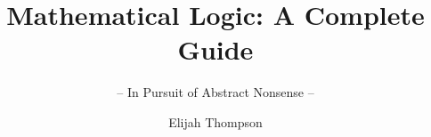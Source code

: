 \documentclass[graybox,envcountchap,sectrefs]{style/svmono}
\begin{document}
\author{Elijah Thompson}
\title{Mathematical Logic: A Complete Guide}
\subtitle{-- In Pursuit of Abstract Nonsense --}
\maketitle

\frontmatter%

%
%

%

\tableofcontents

%


\mainmatter%























































\backmatter%
%
%
%
\printindex

\end{document}
